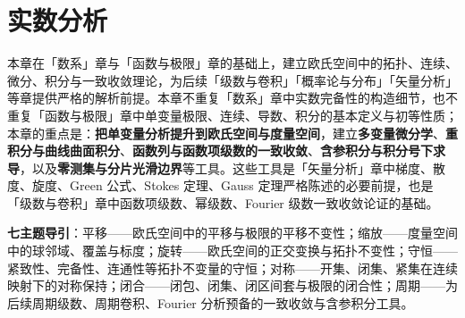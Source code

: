 \chapter{实数分析}
\label{chap:real_analysis}

\begin{remark}[本章定位]\label{rem:real_analysis_positioning}
本章在「数系」章与「函数与极限」章的基础上，建立欧氏空间中的拓扑、连续、微分、积分与一致收敛理论，为后续「级数与卷积」「概率论与分布」「矢量分析」等章提供严格的解析前提。本章不重复「数系」章中实数完备性的构造细节，也不重复「函数与极限」章中单变量极限、连续、导数、积分的基本定义与初等性质；本章的重点是：\textbf{把单变量分析提升到欧氏空间与度量空间}，建立\textbf{多变量微分学}、\textbf{重积分与曲线曲面积分}、\textbf{函数列与函数项级数的一致收敛}、\textbf{含参积分与积分号下求导}，以及\textbf{零测集与分片光滑边界}等工具。这些工具是「矢量分析」章中梯度、散度、旋度、Green 公式、Stokes 定理、Gauss 定理严格陈述的必要前提，也是「级数与卷积」章中函数项级数、幂级数、Fourier 级数一致收敛论证的基础。

\textbf{七主题导引}：平移——欧氏空间中的平移与极限的平移不变性；缩放——度量空间中的球邻域、覆盖与标度；旋转——欧氏空间的正交变换与拓扑不变性；守恒——紧致性、完备性、连通性等拓扑不变量的守恒；对称——开集、闭集、紧集在连续映射下的对称保持；闭合——闭包、闭集、闭区间套与极限的闭合性；周期——为后续周期级数、周期卷积、Fourier 分析预备的一致收敛与含参积分工具。
\end{remark}

